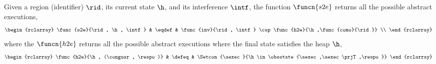 \begin{defn}
\label{def:world2aexec}
\label{def:state2aexec}
Given a region (identifier) \(\rid\), its current state \( \h \), and its interference \( \intf \), the function \(\funcn{s2e} \) returns all the possible abstract executions,
\[
\begin{rclarray}
    \func{s2e}{\rid, \h, \intf} & \eqdef & \func{inv}{\rid, \intf} \cap \func{h2e}{\h,\func{como}{\rid}} \\
\end{rclarray}
\]
where the \( \funcn{h2e} \) returns all the possible abstract executions where the final state satisfies the heap \( \h \), 
\[
\begin{rclarray}
    \func{h2e}{\h, (\conguar, \respo)} & \defeq & \Setcon{\aexec}{\h \in \obsstate{\aexec,\aexec\prjT,\respo}}
\end{rclarray}
\]
\end{defn}
